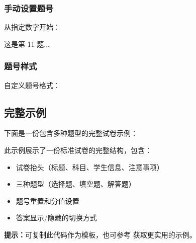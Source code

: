 \subsubsection{手动设置题号}

从指定数字开始：

\begin{latexcode}

  \begin{question}
    这是第 11 题...
  \end{question}
\end{latexcode}

\subsubsection{题号样式}

自定义题号格式：

\begin{latexcode}
\end{latexcode}


\subsection{完整示例}

下面是一份包含多种题型的完整试卷示例：

\begin{tcolorbox}[colback=green!5!white, colframe=green!75!black, title=\textbf{完整示例说明}]
此示例展示了一份标准试卷的完整结构，包含：
\begin{itemize}
  \item 试卷抬头（标题、科目、学生信息、注意事项）
  \item 三种题型（选择题、填空题、解答题）
  \item 题号重置和分值设置
  \item 答案显示/隐藏的切换方式
\end{itemize}

\textbf{提示：}可复制此代码作为模板，也可参考  获取更实用的示例。
\end{tcolorbox}

